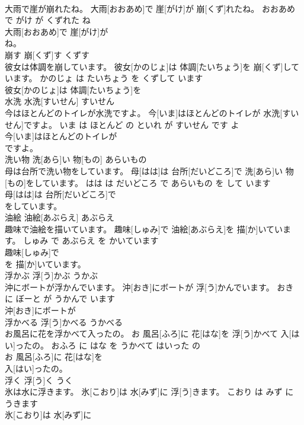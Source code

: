 \documentclass[8pt]{extreport}
\begin{document}
\begin{CJK}{UTF8}{min}
\\	大雨で崖が崩れたね。	大雨[おおあめ]で 崖[がけ]が 崩[くず]れたね。	おおあめ で がけ が くずれた ね	
\\	大雨[おおあめ]で 崖[がけ]が
\\	ね。			
\\	崩す	崩[くず]す	くずす	
\\	彼女は体調を崩しています。	彼女[かのじょ]は 体調[たいちょう]を 崩[くず]しています。	かのじょ は たいちょう を くずして います	
\\	彼女[かのじょ]は 体調[たいちょう]を
\\	水洗	水洗[すいせん]	すいせん	
\\	今はほとんどのトイレが水洗ですよ。	今[いま]はほとんどのトイレが 水洗[すいせん]ですよ。	いま は ほとんど の といれ が すいせん です よ	
\\	今[いま]はほとんどのトイレが
\\	ですよ。			
\\	洗い物	洗[あら]い 物[もの]	あらいもの	
\\	母は台所で洗い物をしています。	母[はは]は 台所[だいどころ]で 洗[あら]い 物[もの]をしています。	はは は だいどころ で あらいもの を して います	
\\	母[はは]は 台所[だいどころ]で
\\	をしています。			
\\	油絵	油絵[あぶらえ]	あぶらえ	
\\	趣味で油絵を描いています。	趣味[しゅみ]で 油絵[あぶらえ]を 描[か]いています。	しゅみ で あぶらえ を かいています	
\\	趣味[しゅみ]で
\\	を 描[か]いています。			
\\	浮かぶ	浮[う]かぶ	うかぶ	
\\	沖にボートが浮かんでいます。	沖[おき]にボートが 浮[う]かんでいます。	おき に ぼーと が うかんで います	
\\	沖[おき]にボートが
\\	浮かべる	浮[う]かべる	うかべる	
\\	お風呂に花を浮かべて入ったの。	お 風呂[ふろ]に 花[はな]を 浮[う]かべて 入[はい]ったの。	おふろ に はな を うかべて はいった の	
\\	お 風呂[ふろ]に 花[はな]を
\\	入[はい]ったの。			
\\	浮く	浮[う]く	うく	
\\	氷は水に浮きます。	氷[こおり]は 水[みず]に 浮[う]きます。	こおり は みず に うきます	
\\	氷[こおり]は 水[みず]に

\end{CJK}
\end{document}
